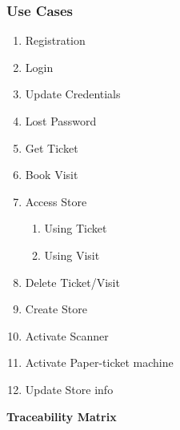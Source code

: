 \documentclass[a4paper, 12pt, oneside]{article}
\begin{document}
\subsubsection{Use Cases}
\begin{enumerate}[labelindent=20pt, label={UC.\arabic*}, itemindent=1em,leftmargin=!]
    \item Registration \label{uc:registration}
    \item Login \label{uc:login}
    \item Update Credentials \label{uc:updateCredentials}
    \item Lost Password \label{uc:lostPassword}
    \item Get Ticket \label{uc:getTicket}
    \item Book Visit \label{uc:getVisit}
    \item Access Store \label{uc:accessStore}
    \begin{enumerate}[label={-}]
        \item Using Ticket
        \item Using Visit
    \end{enumerate}
    \item Delete Ticket/Visit \label{uc:deleteBooked}
    \item Create Store \label{uc:createStore}
    \item Activate Scanner \label{uc:useScanner}
    \item Activate Paper-ticket machine \label{uc:usePaper}
    \item Update Store info \label{uc:updateStoreInfo}
\end{enumerate}
\newpage
\label{uc:traceabilityMatrix}
\begin{center}
{\textbf{Traceability Matrix}}
\end{center}
\end{document}
